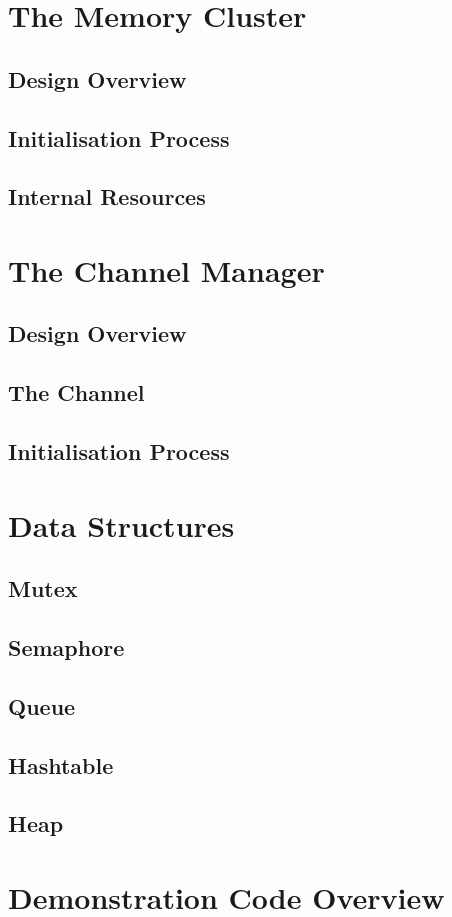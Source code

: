 \documentclass[12pt,a4paper]{article}
\begin{document}
\section{The Memory Cluster}
\subsection{Design Overview}
\subsection{Initialisation Process}
\subsection{Internal Resources}

\section{The Channel Manager}
\subsection{Design Overview}
\subsection{The Channel}
\subsection{Initialisation Process}

\section{Data Structures}
\subsection{Mutex}
\subsection{Semaphore}
\subsection{Queue}
\subsection{Hashtable}
\subsection{Heap}

\section{Demonstration Code Overview}


\end{document}
